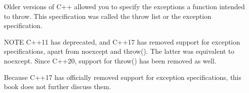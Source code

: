 
Older versions of C++ allowed you to specify the exceptions a function intended to throw. This specification was called the throw list or the exception specification.

\begin{myNotic}{NOTE}
C++11 has deprecated, and C++17 has removed support for exception specifications, apart from noexcept and throw(). The latter was equivalent to noexcept. Since C++20, support for throw() has been removed as well.
\end{myNotic}

Because C++17 has officially removed support for exception specifications, this book does not further discuss them.


